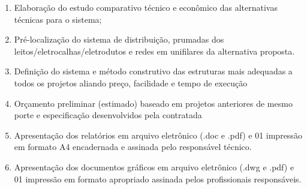 \begin{enumerate}
\begin{enumerate}
			\item Elaboração do estudo comparativo técnico e econômico das alternativas técnicas para o sistema;
			
			\item Pré-localização do sistema de distribuição, prumadas dos leitos/eletrocalhas/eletrodutos e redes em unifilares da alternativa proposta.
			
			\item Definição do sistema e método construtivo das estruturas mais adequadas a todos os projetos aliando preço, facilidade e tempo de execução
			
			\item Orçamento preliminar (estimado) baseado em projetos anteriores de mesmo porte e especificação desenvolvidos pela contratada
			
			\item Apresentação dos relatórios em arquivo eletrônico (.doc e .pdf) e 01 impressão em formato A4 encadernada e assinada pelo responsável técnico.
			
			\item Apresentação dos documentos gráficos em arquivo eletrônico (.dwg e .pdf) e 01 impressão em formato apropriado assinada pelos profissionais responsáveis.

		\end{enumerate}
	
\end{enumerate}
